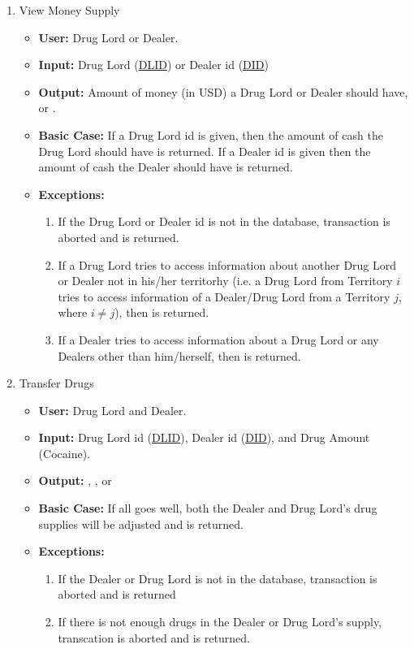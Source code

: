 \documentclass[11pt, oneside]{article}   	%
\theoremstyle{definition}
\theoremstyle{remark}
\begin{document}
\begin{enumerate}
	
	\item View Money Supply
	\begin{itemize}
		\item \textbf{User:} Drug Lord or Dealer.
		\item \textbf{Input:} Drug Lord (\underline{DLID}) or Dealer id (\underline{DID})
		\item \textbf{Output:} Amount of money (in USD) a Drug Lord or Dealer should have,  or .
		\item \textbf{Basic Case:} If a Drug Lord id is given, then the amount of cash the Drug Lord should have is returned. If a Dealer id is given then the amount of cash the Dealer should have is returned.
		\item \textbf{Exceptions:}
		\begin{enumerate}
			\item If the Drug Lord or Dealer id is not in the database, transaction is aborted and  is returned.
			\item If a Drug Lord tries to access information about another Drug Lord or Dealer not in his/her territorhy (i.e. a Drug Lord from Territory $i$ tries to access information of a Dealer/Drug Lord from a Territory $j$, where $i\neq j$), then  is returned.	
			\item If a Dealer tries to access information about a Drug Lord or any Dealers other than him/herself, then  is returned.	
		\end{enumerate}
	\end{itemize}	


	\item Transfer Drugs
	\begin{itemize}
		\item \textbf{User:} Drug Lord and Dealer.
		\item \textbf{Input:} Drug Lord id (\underline{DLID}), Dealer id (\underline{DID}), and Drug Amount (Cocaine).
		\item \textbf{Output:} , , or 
		\item \textbf{Basic Case:} If all goes well, both the Dealer and Drug Lord's drug supplies will be adjusted and  is returned.
		\item \textbf{Exceptions:}
		\begin{enumerate}
			\item If the Dealer or Drug Lord is not in the database, transaction is aborted and  is returned
			\item If there is not enough drugs in the Dealer or Drug Lord's supply, transcation is aborted and  is returned.
		\end{enumerate}
	\end{itemize}
		

\end{enumerate}
\end{document}
